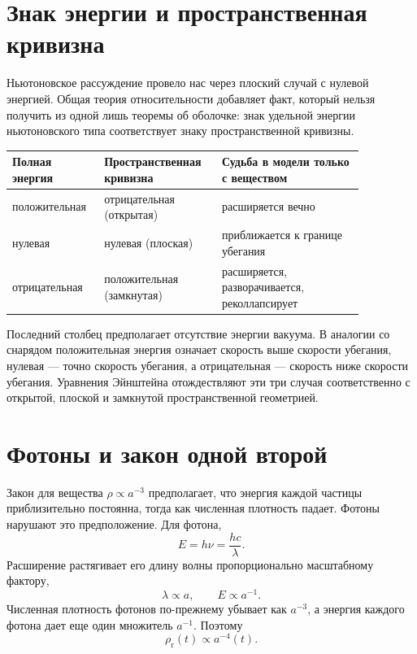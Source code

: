 \section{Знак энергии и пространственная кривизна}

Ньютоновское рассуждение провело нас через плоский случай с нулевой энергией. Общая теория относительности добавляет факт, который нельзя получить из одной лишь теоремы об оболочке: знак удельной энергии ньютоновского типа соответствует знаку пространственной кривизны.
\begin{center}
\begin{tabular}{@{}>{\raggedright\arraybackslash}p{0.20\linewidth}
                    >{\raggedright\arraybackslash}p{0.29\linewidth}
                    >{\raggedright\arraybackslash}p{0.37\linewidth}@{}}
  \toprule
  Полная энергия & Пространственная кривизна & Судьба в модели только с веществом \\
  \midrule
  положи\-тельная & отрицательная (открытая) & расширяется вечно \\
  нулевая & нулевая (плоская) & приближается к границе убегания \\
  отри\-цательная & положительная (замкнутая) & расширяется, разворачивается, реколлапсирует \\
  \bottomrule
\end{tabular}
\end{center}
Последний столбец предполагает отсутствие энергии вакуума. В аналогии со снарядом положительная энергия означает скорость выше скорости убегания, нулевая — точно скорость убегания, а отрицательная — скорость ниже скорости убегания. Уравнения Эйнштейна отождествляют эти три случая соответственно с открытой, плоской и замкнутой пространственной геометрией.

\section{Фотоны и закон одной второй}

Закон для вещества \(\rho\propto a^{-3}\) предполагает, что энергия каждой частицы приблизительно постоянна, тогда как численная плотность падает. Фотоны нарушают это предположение. Для фотона,
\begin{equation}
  E=h\nu=\frac{hc}{\lambda}.
\end{equation}
Расширение растягивает его длину волны пропорционально масштабному фактору,
\begin{equation}
  \lambda\propto a,
  \qquad E\propto a^{-1}.
\end{equation}
Численная плотность фотонов по-прежнему убывает как \(a^{-3}\), а энергия каждого фотона дает еще один множитель \(a^{-1}\). Поэтому
\begin{equation}
  \boxed{\rho_{\mathrm r}(t)\propto a^{-4}(t)}.
  \label{eq:l09-radiation-dilution}
\end{equation}

